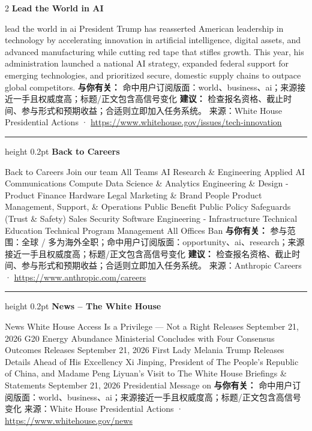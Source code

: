 \documentclass[10.5pt]{ctexart}
\begin{document}
\begin{multicols}{2}
{\large\bfseries Lead the World in AI}\par
lead the world in ai President Trump has reasserted American leadership in technology by accelerating innovation in artificial intelligence, digital assets, and advanced manufacturing while cutting red tape that stifles growth. This year, his administration launched a national AI strategy, expanded federal support for emerging technologies, and prioritized secure, domestic supply chains to outpace global competitors.
\textbf{与你有关：} 命中用户订阅版面：world、business、ai；来源接近一手且权威度高；标题/正文包含高信号变化
\textbf{建议：} 检查报名资格、截止时间、参与形式和预期收益；合适则立即加入任务系统。
{\footnotesize\color{ormuted} 来源：White House Presidential Actions · \url{https://www.whitehouse.gov/issues/tech-innovation}}
\vspace{2mm}
\hrule height 0.2pt
\vspace{2mm}
{\large\bfseries Back to Careers}\par
Back to Careers Join our team All Teams AI Research \& Engineering Applied AI Communications Compute Data Science \& Analytics Engineering \& Design - Product Finance Hardware Legal Marketing \& Brand People Product Management, Support, \& Operations Public Benefit Public Policy Safeguards (Trust \& Safety) Sales Security Software Engineering - Infrastructure Technical Education Technical Program Management All Offices Ban
\textbf{与你有关：} 参与范围：全球 / 多为海外全职；命中用户订阅版面：opportunity、ai、research；来源接近一手且权威度高；标题/正文包含高信号变化
\textbf{建议：} 检查报名资格、截止时间、参与形式和预期收益；合适则立即加入任务系统。
{\footnotesize\color{ormuted} 来源：Anthropic Careers · \url{https://www.anthropic.com/careers}}
\vspace{2mm}
\hrule height 0.2pt
\vspace{2mm}
{\large\bfseries News – The White House}\par
News White House Access Is a Privilege — Not a Right Releases September 21, 2026 G20 Energy Abundance Ministerial Concludes with Four Consensus Outcomes Releases September 21, 2026 First Lady Melania Trump Releases Details Ahead of His Excellency Xi Jinping, President of The People’s Republic of China, and Madame Peng Liyuan’s Visit to The White House Briefings \& Statements September 21, 2026 Presidential Message on 
\textbf{与你有关：} 命中用户订阅版面：world、business、ai；来源接近一手且权威度高；标题/正文包含高信号变化
{\footnotesize\color{ormuted} 来源：White House Presidential Actions · \url{https://www.whitehouse.gov/news}}

\end{multicols}
\end{document}
